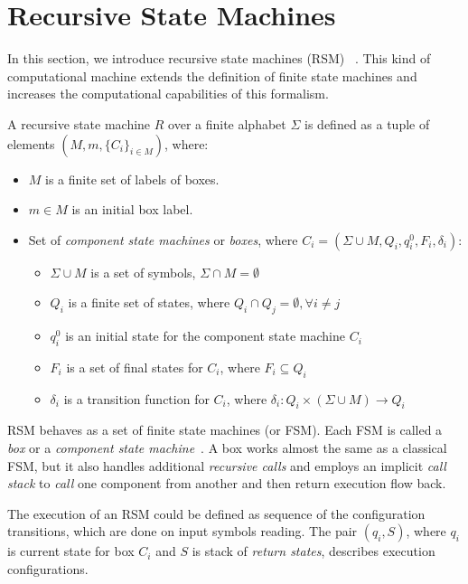 \section{Recursive State Machines}

In this section, we introduce recursive state machines (RSM)~\cite{rsm:analysis:10.1007/3-540-44585-4_18}   .
This kind of computational machine extends the definition of finite state machines and increases the computational capabilities of this formalism.

A recursive state machine $R$ over a finite alphabet $\Sigma$ is defined as a tuple of elements $(M,m,\{C_i\}_{i \in M})$, where:

\begin{itemize}
    \item $M$ is a finite set of labels of boxes.
    \item $m \in M$ is an initial box label.
    \item Set of \textit{component state machines} or \textit{boxes},
          where $C_i=(\Sigma \cup M, Q_i,q_i^0,F_i,\delta_i)$:
    \begin{itemize}
        \item $\Sigma \cup M$ is a set of symbols, $\Sigma \cap M = \emptyset$
        \item $Q_i$ is a finite set of states,
              where $Q_i \cap Q_j = \emptyset, \forall i \neq j$
        \item $q_i^0$ is an initial state for the component state machine $C_i$
        \item $F_i$ is a set of final states for $C_i$, where $F_i \subseteq Q_i$
        \item $\delta_i$ is a transition function for $C_i$,
              where $\delta_i: Q_i \times (\Sigma \cup M)
              \to Q_i$
    \end{itemize}
\end{itemize}

RSM behaves as a set of finite state machines (or FSM).
Each FSM is called a \textit{box} or a \textit{component state machine}~\cite{rsm:analysis:10.1007/3-540-44585-4_18}.
A box works almost the same as a classical FSM, but it also handles additional \textit{recursive calls} and employs an implicit \textit{call stack} to \textit{call} one component from another and then return execution flow back.

The execution of an RSM could be defined as sequence of the configuration transitions, which are done on input symbols reading. 
The pair $(q_i,S)$, where $q_i$ is current state for box $C_i$ and $S$ is stack of \textit{return states}, describes execution configurations. 

